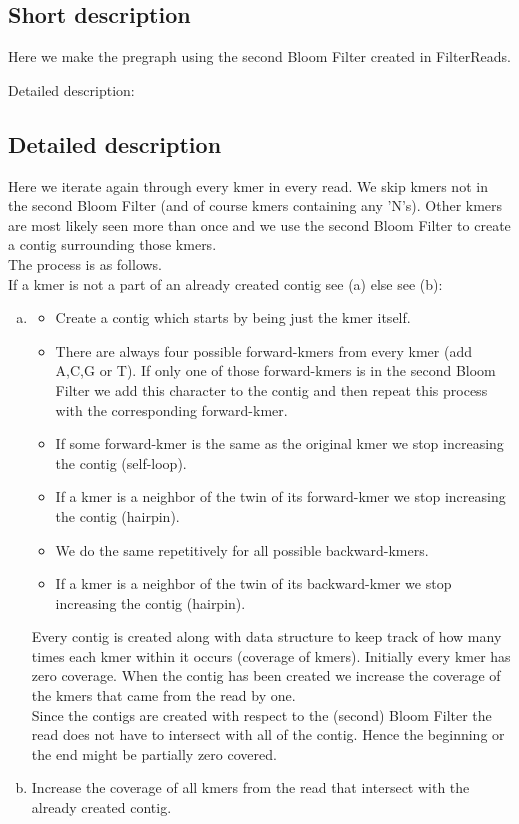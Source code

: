 \documentclass[a4paper]{report}
\begin{document}
\subsection{Short description}
Here we make the pregraph using the second Bloom Filter created in FilterReads. 

Detailed description:
\subsection{Detailed description}
Here we iterate again through every kmer in every read. We skip kmers not in the second Bloom Filter (and of course kmers 
containing any 'N's). 
Other kmers are most likely seen more than once and we use the second Bloom Filter to create a contig surrounding those kmers.\\[4pt]

The process is as follows.\\ 
If a kmer is not a part of an already created contig see (a) else see (b):
\begin{enumerate}[(a)]
\item
\begin{itemize} 
\item Create a contig which starts by being just the kmer itself.
\item There are always four possible forward-kmers from every kmer (add A,C,G or T). If only one of those 
forward-kmers is in the second Bloom Filter we add this character to the contig and then repeat this process
with the corresponding forward-kmer.
\item If some forward-kmer is the same as the original kmer we stop increasing the contig (self-loop).
\item If a kmer is a neighbor of the twin of its forward-kmer we stop increasing the contig (hairpin).
\item We do the same repetitively for all possible backward-kmers.
\item If a kmer is a neighbor of the twin of its backward-kmer we stop increasing the contig (hairpin).
\end{itemize}

Every contig is created along with data structure to keep track of how many times each kmer within it occurs (coverage of kmers).
Initially every kmer has zero coverage. 
When the contig has been created we increase the coverage of the kmers that came from the read by one.\\[4pt]

Since the contigs are created with respect to the (second) Bloom Filter the read does not have to intersect with all of the contig. Hence
the beginning or the end might be partially zero covered.\\[4pt]
\item Increase the coverage of all kmers from the read that intersect with the already created contig.
\end{enumerate}
\end{document}
